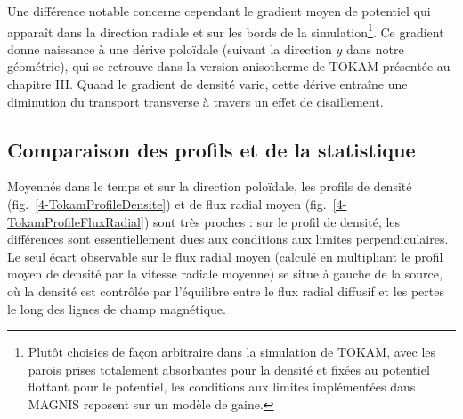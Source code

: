 \begin{refsection}
Une différence notable concerne cependant le gradient moyen de potentiel qui
apparaît dans la direction radiale et sur les bords de la 
simulation\footnote{Plutôt choisies de façon arbitraire dans la simulation de
TOKAM, avec les parois prises totalement absorbantes pour la densité et fixées
au potentiel flottant pour le potentiel, les conditions aux limites
implémentées dans MAGNIS reposent sur un modèle de gaine.}. Ce gradient donne
naissance à une dérive poloïdale (suivant la direction $y$ dans notre
géométrie), qui se retrouve dans la version anisotherme de TOKAM présentée au chapitre III.
Quand le gradient de densité varie, cette dérive entraîne une diminution du
transport transverse à travers un effet de cisaillement. 

\subsection{Comparaison des profils et de la statistique}

Moyennés dans le temps et sur la direction poloïdale, les profils de densité
(fig.~\ref{4-TokamProfileDensite}) et de flux radial moyen
(fig.~\ref{4-TokamProfileFluxRadial}) sont très proches : sur le profil de
densité, les différences sont essentiellement dues aux conditions aux limites
perpendiculaires. Le seul écart observable sur le flux radial
moyen (calculé en multipliant le profil moyen de densité par la vitesse
radiale moyenne) se situe à gauche de la source, où la densité est contrôlée par
l'équilibre entre le flux radial diffusif et les pertes le long des lignes de
champ magnétique.


\end{refsection}
